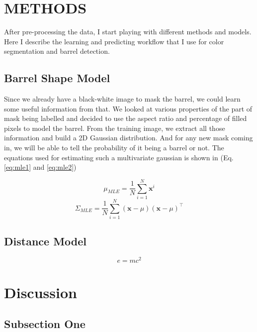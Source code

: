 \documentclass[twoside]{article}
\begin{document}
\begin{multicols}{2}
\section{METHODS}
After pre-processing the data, I start playing with different methods and models. Here I describe the learning and predicting workflow that I use for color segmentation and barrel detection.

\subsection{Barrel Shape Model}
Since we already have a black-white image to mask the barrel, we could learn some useful information from that. We looked at various properties of the part of mask being labelled and decided to use the aspect ratio and percentage of filled pixels to model the barrel. From the training image, we extract all those information and build a 2D Gaussian distribution. And for any new mask coming in, we will be able to tell the probability of it being a barrel or not. The equations used for estimating such a multivariate gaussian is shown in (Eq.\ref{eq:mle1} and \ref{eq:mle2})

\begin{equation}
\mu_{MLE} = \frac{1}{N}\sum_{i=1}^N\mathbf{x}^i
\label{eq:mle1}
\end{equation}
\begin{equation}
\Sigma_{MLE} = \frac{1}{N}\sum_{i=1}^N(\mathbf{x}-\mu)(\mathbf{x}-\mu)^{\top}
\label{eq:mle2}
\end{equation}

\subsection{Distance Model}

\lipsum[5] %

\begin{equation}
\label{eq:emc}
e = mc^2
\end{equation}

\lipsum[6] %


\section{Discussion}

\subsection{Subsection One}


\end{multicols}
\end{document}
